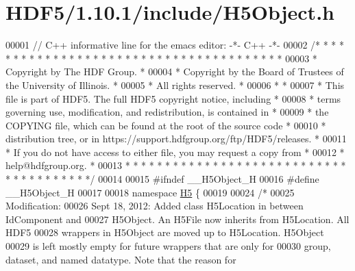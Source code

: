 \hypertarget{_h_d_f5_21_810_81_2include_2_h5_object_8h_source}{}\section{H\+D\+F5/1.10.1/include/\+H5\+Object.h}
\label{_h_d_f5_21_810_81_2include_2_h5_object_8h_source}

\begin{DoxyCode}
00001 \textcolor{comment}{// C++ informative line for the emacs editor: -*- C++ -*-}
00002 \textcolor{comment}{/* * * * * * * * * * * * * * * * * * * * * * * * * * * * * * * * * * * * * * *}
00003 \textcolor{comment}{ * Copyright by The HDF Group.                                               *}
00004 \textcolor{comment}{ * Copyright by the Board of Trustees of the University of Illinois.         *}
00005 \textcolor{comment}{ * All rights reserved.                                                      *}
00006 \textcolor{comment}{ *                                                                           *}
00007 \textcolor{comment}{ * This file is part of HDF5.  The full HDF5 copyright notice, including     *}
00008 \textcolor{comment}{ * terms governing use, modification, and redistribution, is contained in    *}
00009 \textcolor{comment}{ * the COPYING file, which can be found at the root of the source code       *}
00010 \textcolor{comment}{ * distribution tree, or in https://support.hdfgroup.org/ftp/HDF5/releases.  *}
00011 \textcolor{comment}{ * If you do not have access to either file, you may request a copy from     *}
00012 \textcolor{comment}{ * help@hdfgroup.org.                                                        *}
00013 \textcolor{comment}{ * * * * * * * * * * * * * * * * * * * * * * * * * * * * * * * * * * * * * * */}
00014 
00015 \textcolor{preprocessor}{#ifndef \_\_H5Object\_H}
00016 \textcolor{preprocessor}{#define \_\_H5Object\_H}
00017 
00018 \textcolor{keyword}{namespace }\hyperlink{namespace_h5}{H5} \{
00019 
00024 \textcolor{comment}{/*}
00025 \textcolor{comment}{    Modification:}
00026 \textcolor{comment}{        Sept 18, 2012: Added class H5Location in between IdComponent and}
00027 \textcolor{comment}{                H5Object.  An H5File now inherits from H5Location.  All HDF5}
00028 \textcolor{comment}{                wrappers in H5Object are moved up to H5Location.  H5Object}
00029 \textcolor{comment}{                is left mostly empty for future wrappers that are only for}
00030 \textcolor{comment}{                group, dataset, and named datatype.  Note that the reason for}

\end{DoxyCode}

